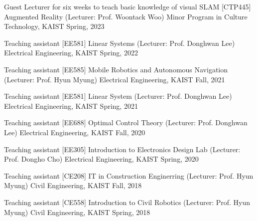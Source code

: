 

\begin{cventries}

  \cventry
    {Guest Lecturer for six weeks to teach basic knowledge of visual SLAM} %
    {[CTP445] Augmented Reality (Lecturer: Prof. Woontack Woo)} %
    {Minor Program in Culture Technology, KAIST} %
    {Spring, 2023} %
    {}

  \cventry
    {Teaching assistant} %
    {[EE581] Linear Systems (Lecturer: Prof. Donghwan Lee)} %
    {Electrical Engineering, KAIST} %
    {Spring, 2022} %
    {}

  \cventry
    {Teaching assistant} %
    {[EE585] Mobile Robotics and Autonomous Navigation (Lecturer: Prof. Hyun Myung)} %
    {Electrical Engineering, KAIST} %
    {Fall, 2021} %
    {
    }

  \cventry
    {Teaching assistant} %
    {[EE581] Linear System (Lecturer: Prof. Donghwan Lee)} %
    {Electrical Engineering, KAIST} %
    {Spring, 2021} %
    {
    }

  \cventry
    {Teaching assistant} %
    {[EE688] Optimal Control Theory (Lecturer: Prof. Donghwan Lee)} %
    {Electrical Engineering, KAIST} %
    {Fall, 2020} %
    {
    }

  \cventry
    {Teaching assistant} %
    {[EE305] Introduction to Electronics Design Lab (Lecturer: Prof. Dongho Cho)} %
    {Electrical Engineering, KAIST} %
    {Spring, 2020} %
    {
    }

   \cventry
    {Teaching assistant} %
    {[CE208] IT in Construction Enginerring (Lecturer: Prof. Hyun Myung)} %
    {Civil Engineering, KAIST} %
    {Fall, 2018} %
    {
    }

  \cventry
    {Teaching assistant} %
    {[CE558] Introduction to Civil Robotics (Lecturer: Prof. Hyun Myung)} %
    {Civil Engineering, KAIST} %
    {Spring, 2018} %
    {
    }
\end{cventries}
